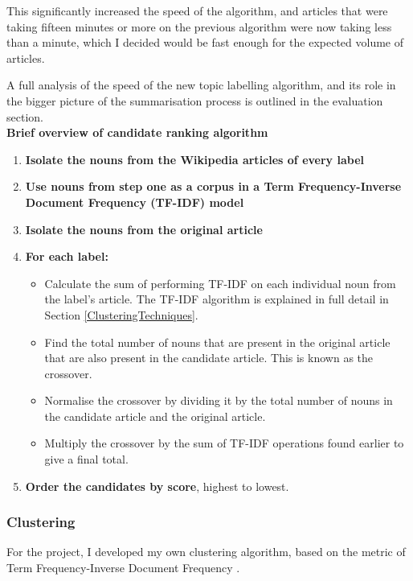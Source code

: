 \documentclass[12pt]{article}
\begin{document}
This significantly increased the speed of the algorithm, and articles that were taking fifteen minutes or more on the previous algorithm were now taking less than a minute, which I decided would be fast enough for the expected volume of articles.

A full analysis of the speed of the new topic labelling algorithm, and its role in the bigger picture of the summarisation process is outlined in the evaluation section. \\

\textbf{Brief overview of candidate ranking algorithm} \\

\begin{enumerate}
	\item \textbf{Isolate the nouns from the Wikipedia articles of every label}
	\item \textbf{Use nouns from step one as a corpus in a Term Frequency-Inverse Document Frequency (TF-IDF) model} \cite{tfidf} 
	\item \textbf{Isolate the nouns from the original article} 
	\item \textbf{For each label:}
		\begin{itemize}
			\item Calculate the sum of performing TF-IDF on each individual noun from the label's article. The TF-IDF algorithm is explained in full detail in Section \ref{ClusteringTechniques}. 
			\item Find the total number of nouns that are present in the original article that are also present in the candidate article. This is known as the crossover. 
			\item Normalise the crossover by dividing it by the total number of nouns in the candidate article and the original article. 
			\item Multiply the crossover by the sum of TF-IDF operations found earlier to give a final total. 
		\end{itemize}
	\item \textbf{Order the candidates by score}, highest to lowest.
\end{enumerate}

\subsubsection{Clustering}

For the project, I developed my own clustering algorithm, based on the metric of Term Frequency-Inverse Document Frequency \cite{tfidf}. 
\end{document}
